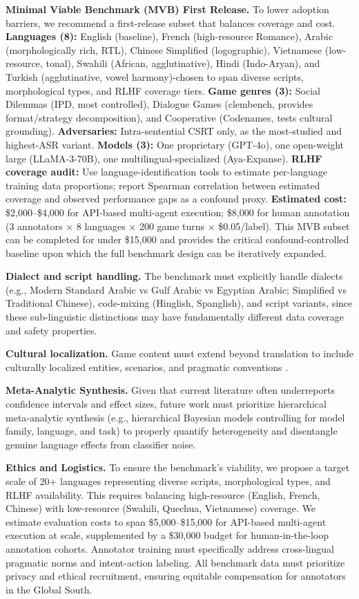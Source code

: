 \documentclass[11pt]{article}
\begin{document}
\textbf{Minimal Viable Benchmark (MVB) First Release.} To lower adoption barriers, we recommend a first-release subset that balances coverage and cost. \textbf{Languages (8):} English (baseline), French (high-resource Romance), Arabic (morphologically rich, RTL), Chinese Simplified (logographic), Vietnamese (low-resource, tonal), Swahili (African, agglutinative), Hindi (Indo-Aryan), and Turkish (agglutinative, vowel harmony)-chosen to span diverse scripts, morphological types, and RLHF coverage tiers. \textbf{Game genres (3):} Social Dilemmas (IPD, most controlled), Dialogue Games (clembench, provides format/strategy decomposition), and Cooperative (Codenames, tests cultural grounding). \textbf{Adversaries:} Intra-sentential CSRT only, as the most-studied and highest-ASR variant. \textbf{Models (3):} One proprietary (GPT-4o), one open-weight large (LLaMA-3-70B), one multilingual-specialized (Aya-Expanse). \textbf{RLHF coverage audit:} Use language-identification tools to estimate per-language training data proportions; report Spearman correlation between estimated coverage and observed performance gaps as a confound proxy. \textbf{Estimated cost:} \$2{,}000--\$4{,}000 for API-based multi-agent execution; \$8{,}000 for human annotation (3 annotators $\times$ 8 languages $\times$ 200 game turns $\times$ \$0.05/label). This MVB subset can be completed for under \$15{,}000 and provides the critical confound-controlled baseline upon which the full benchmark design can be iteratively expanded.

\textbf{Dialect and script handling.} The benchmark must explicitly handle dialects (e.g., Modern Standard Arabic vs Gulf Arabic vs Egyptian Arabic; Simplified vs Traditional Chinese), code-mixing (Hinglish, Spanglish), and script variants, since these sub-linguistic distinctions may have fundamentally different data coverage and safety properties.

\textbf{Cultural localization.} Game content must extend beyond translation to include culturally localized entities, scenarios, and pragmatic conventions \citep{koto2025spyfall}.

\textbf{Meta-Analytic Synthesis.} Given that current literature often underreports confidence intervals and effect sizes, future work must prioritize hierarchical meta-analytic synthesis (e.g., hierarchical Bayesian models controlling for model family, language, and task) to properly quantify heterogeneity and disentangle genuine language effects from classifier noise.

\textbf{Ethics and Logistics.} To ensure the benchmark's viability, we propose a target scale of 20+ languages representing diverse scripts, morphological types, and RLHF availability. This requires balancing high-resource (English, French, Chinese) with low-resource (Swahili, Quechua, Vietnamese) coverage. We estimate evaluation costs to span \$5,000--\$15,000 for API-based multi-agent execution at scale, supplemented by a \$30,000 budget for human-in-the-loop annotation cohorts. Annotator training must specifically address cross-lingual pragmatic norms and intent-action labeling. All benchmark data must prioritize privacy and ethical recruitment, ensuring equitable compensation for annotators in the Global South.
\end{document}
